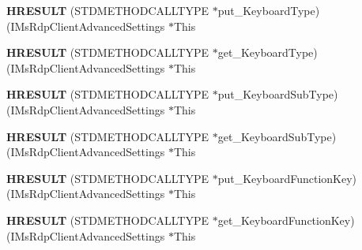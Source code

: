 \begin{DoxyCompactItemize}
\item 
\mbox{\label{struct_i_ms_rdp_client_advanced_settings_vtbl_a93b6199a0082ac5d504f4c19d7d24583}} 
{\bfseries H\+R\+E\+S\+U\+LT} (S\+T\+D\+M\+E\+T\+H\+O\+D\+C\+A\+L\+L\+T\+Y\+PE $\ast$put\+\_\+\+Keyboard\+Type)(I\+Ms\+Rdp\+Client\+Advanced\+Settings $\ast$This
\item 
\mbox{\label{struct_i_ms_rdp_client_advanced_settings_vtbl_aa8b0f4683dadc5eaf3466adb1a876933}} 
{\bfseries H\+R\+E\+S\+U\+LT} (S\+T\+D\+M\+E\+T\+H\+O\+D\+C\+A\+L\+L\+T\+Y\+PE $\ast$get\+\_\+\+Keyboard\+Type)(I\+Ms\+Rdp\+Client\+Advanced\+Settings $\ast$This
\item 
\mbox{\label{struct_i_ms_rdp_client_advanced_settings_vtbl_ae523330b671df61abad1b5b4ca7fd1f9}} 
{\bfseries H\+R\+E\+S\+U\+LT} (S\+T\+D\+M\+E\+T\+H\+O\+D\+C\+A\+L\+L\+T\+Y\+PE $\ast$put\+\_\+\+Keyboard\+Sub\+Type)(I\+Ms\+Rdp\+Client\+Advanced\+Settings $\ast$This
\item 
\mbox{\label{struct_i_ms_rdp_client_advanced_settings_vtbl_aa6ed05085dde98575d21f777ca2cca73}} 
{\bfseries H\+R\+E\+S\+U\+LT} (S\+T\+D\+M\+E\+T\+H\+O\+D\+C\+A\+L\+L\+T\+Y\+PE $\ast$get\+\_\+\+Keyboard\+Sub\+Type)(I\+Ms\+Rdp\+Client\+Advanced\+Settings $\ast$This
\item 
\mbox{\label{struct_i_ms_rdp_client_advanced_settings_vtbl_a4644dfcb90ffd3c56261337ca9803ca2}} 
{\bfseries H\+R\+E\+S\+U\+LT} (S\+T\+D\+M\+E\+T\+H\+O\+D\+C\+A\+L\+L\+T\+Y\+PE $\ast$put\+\_\+\+Keyboard\+Function\+Key)(I\+Ms\+Rdp\+Client\+Advanced\+Settings $\ast$This
\item 
\mbox{\label{struct_i_ms_rdp_client_advanced_settings_vtbl_a30602f4b88f43a0ab5ce3c4deb3191d1}} 
{\bfseries H\+R\+E\+S\+U\+LT} (S\+T\+D\+M\+E\+T\+H\+O\+D\+C\+A\+L\+L\+T\+Y\+PE $\ast$get\+\_\+\+Keyboard\+Function\+Key)(I\+Ms\+Rdp\+Client\+Advanced\+Settings $\ast$This
\item 
\mbox{\label{struct_i_ms_rdp_client_advanced_settings_vtbl_a6abe251d42efeae15d11da3b33921d2d}} 

\end{DoxyCompactItemize}
